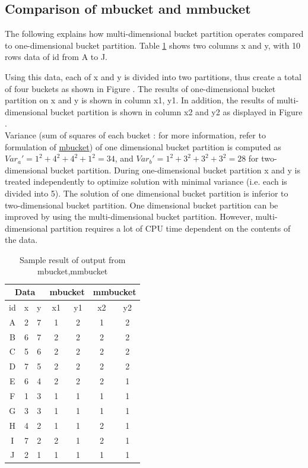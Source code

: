 \subsection*{Comparison of mbucket and mmbucket}

The following explains how multi-dimensional bucket partition operates compared to one-dimensional bucket partition. 
Table \ref{tbl:mmbucket_indata} shows two columns x and y, with 10 rows data of id from A to J. 

Using this data, each of x and y is divided into two partitions, thus create a total of four buckets as shown in Figure \label{fig:mmbucket_1dim}. The results of one-dimensional bucket partition on x and y is shown in column x1, y1. In addition, the results of multi-dimensional bucket partition is shown in column x2 and y2 as displayed in Figure \label{fig:mmbucket_2dim}. \\

Variance (sum of squares of each bucket : for more information, refer to formulation of \hyperref[sect:mbucket]{mbucket}) of one dimensional bucket partition is computed as $Var_a'=1^2+4^2+4^2+1^2=34$, and $Var_b'=1^2+3^2+3^2+3^2=28$ for two-dimensional bucket partition. During one-dimensional bucket partition x and y is treated independently to optimize solution with minimal variance (i.e. each is divided into 5). The solution of one dimensional bucket partition is inferior to two-dimensional bucket partition.
One dimensional bucket partition can be improved by using the multi-dimensional bucket partition. However, multi-dimensional partition requires a lot of CPU time dependent on the contents of the data.


\begin{table}[hbt]
\begin{center}
 \caption{Sample result of output from mbucket,mmbucket\label{tbl:mmbucket_indata}}
{\footnotesize
 \begin{tabular}{c|c|c|c|c|c|c}
  \hline
  \multicolumn{3}{c|}{Data} & \multicolumn{2}{|c|}{mbucket} & \multicolumn{2}{|c}{mmbucket} \\
\hline
id & x & y & x1 & y1 & x2 & y2 \\
\hline
A & 2 & 7 & 1 & 2 & 1 & 2 \\
B & 6 & 7 & 2 & 2 & 2 & 2 \\
C & 5 & 6 & 2 & 2 & 2 & 2 \\
D & 7 & 5 & 2 & 2 & 2 & 2 \\
E & 6 & 4 & 2 & 2 & 2 & 1 \\
F & 1 & 3 & 1 & 1 & 1 & 1 \\
G & 3 & 3 & 1 & 1 & 1 & 1 \\
H & 4 & 2 & 1 & 1 & 2 & 1 \\
I & 7 & 2 & 2 & 1 & 2 & 1 \\
J & 2 & 1& 1 & 1 & 1 & 1 \\ 
\hline
 \end{tabular}
}
\end{center}
\end{table}

